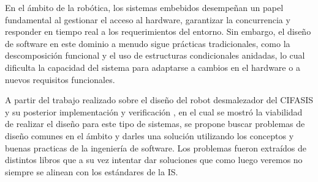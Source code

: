 %
%

En el ámbito de la robótica, los sistemas embebidos desempeñan un papel fundamental al gestionar el acceso al hardware, garantizar la concurrencia y responder en tiempo real a los requerimientos del entorno. Sin embargo, el diseño de software en este dominio a menudo sigue prácticas tradicionales, como la descomposición funcional y el uso de estructuras condicionales anidadas, lo cual dificulta la capacidad del sistema para adaptarse a cambios en el hardware o a nuevos requisitos funcionales.

A partir del trabajo realizado sobre el diseño del robot desmalezador del CIFASIS y su posterior implementación y verificación \cite{paperPomponio}, en el cual se mostró la viabilidad de realizar el diseño para este tipo de sistemas, se propone buscar problemas de diseño comunes en el ámbito y darles una solución utilizando los conceptos y buenas practicas de la ingeniería de software. Los problemas fueron extraídos de distintos libros \cite{douglass}\cite{elecia} que a su vez intentar dar soluciones que como luego veremos no siempre se alinean con los estándares de la IS.
